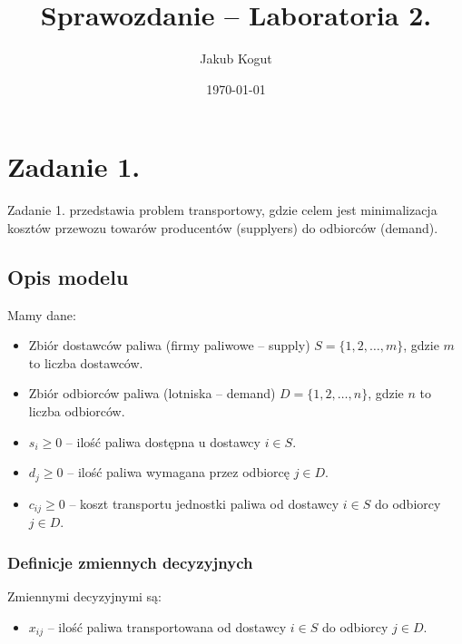 \documentclass[11pt,a4paper]{article}
\title{Sprawozdanie -- Laboratoria 2.}
\author{Jakub Kogut}
\date{\today}
\numberwithin{equation}{section}
\begin{document}
\maketitle

\section{Zadanie 1.}
Zadanie 1. przedstawia problem transportowy, gdzie celem jest minimalizacja kosztów przewozu towarów producentów (supplyers) do odbiorców (demand). 

\subsection{Opis modelu}
Mamy dane:
\begin{itemize}
    \item Zbiór dostawców paliwa (firmy paliwowe -- supply) $S = \{1, 2, \ldots, m\}$, gdzie $m$ to liczba dostawców.
    \item Zbiór odbiorców paliwa (lotniska -- demand) $D = \{1, 2, \ldots, n\}$, gdzie $n$ to liczba odbiorców.
    \item $s_i\geq 0$ -- ilość paliwa dostępna u dostawcy $i \in S$.
    \item $d_j \geq 0$ -- ilość paliwa wymagana przez odbiorcę $j \in D$.
    \item $c_{ij} \geq 0$ -- koszt transportu jednostki paliwa od dostawcy $i \in S$ do odbiorcy $j \in D$.
\end{itemize}
\subsubsection{Definicje zmiennych decyzyjnych}
Zmiennymi decyzyjnymi są:
\begin{itemize}
    \item $x_{ij}$ -- ilość paliwa transportowana od dostawcy $i \in S$ do odbiorcy $j \in D$.
\end{itemize}
\end{document}
